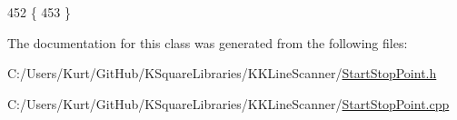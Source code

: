 \begin{DoxyCode}
452 \{
453 \}
\end{DoxyCode}


The documentation for this class was generated from the following files\+:\begin{DoxyCompactItemize}
\item 
C\+:/\+Users/\+Kurt/\+Git\+Hub/\+K\+Square\+Libraries/\+K\+K\+Line\+Scanner/\hyperlink{_start_stop_point_8h}{Start\+Stop\+Point.\+h}\item 
C\+:/\+Users/\+Kurt/\+Git\+Hub/\+K\+Square\+Libraries/\+K\+K\+Line\+Scanner/\hyperlink{_start_stop_point_8cpp}{Start\+Stop\+Point.\+cpp}\end{DoxyCompactItemize}
